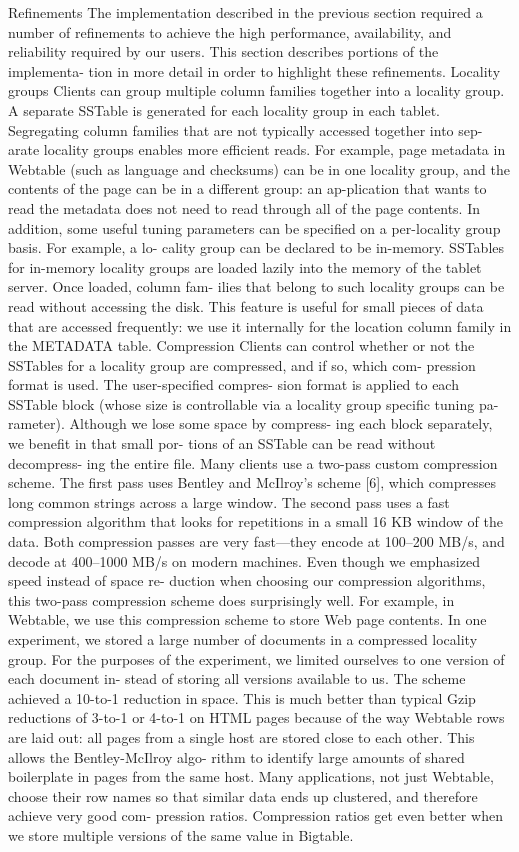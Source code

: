 \documentclass[twocolumn]{article}
\begin{document}
Refinements
The implementation described in the previous section required a number of refinements to achieve the high performance, availability, and reliability required by our users. This section describes portions of the implementa- tion in more detail in order to highlight these refinements.
Locality groups
Clients can group multiple column families together into a locality group. A separate SSTable is generated for each locality group in each tablet. Segregating column families that are not typically accessed together into sep- arate locality groups enables more efficient reads. For example, page metadata in Webtable (such as language and checksums) can be in one locality group, and the contents of the page can be in a different group: an ap-plication that wants to read the metadata does not need to read through all of the page contents.
In addition, some useful tuning parameters can be specified on a per-locality group basis. For example, a lo- cality group can be declared to be in-memory. SSTables for in-memory locality groups are loaded lazily into the memory of the tablet server. Once loaded, column fam- ilies that belong to such locality groups can be read without accessing the disk. This feature is useful for small pieces of data that are accessed frequently: we use it internally for the location column family in the METADATA table.
Compression
Clients can control whether or not the SSTables for a locality group are compressed, and if so, which com- pression format is used. The user-specified compres- sion format is applied to each SSTable block (whose size is controllable via a locality group specific tuning pa- rameter). Although we lose some space by compress- ing each block separately, we benefit in that small por- tions of an SSTable can be read without decompress- ing the entire file. Many clients use a two-pass custom compression scheme. The first pass uses Bentley and McIlroy’s scheme [6], which compresses long common strings across a large window. The second pass uses a fast compression algorithm that looks for repetitions in a small 16 KB window of the data. Both compression passes are very fast—they encode at 100–200 MB/s, and decode at 400–1000 MB/s on modern machines.
Even though we emphasized speed instead of space re- duction when choosing our compression algorithms, this two-pass compression scheme does surprisingly well. For example, in Webtable, we use this compression scheme to store Web page contents. In one experiment, we stored a large number of documents in a compressed locality group. For the purposes of the experiment, we limited ourselves to one version of each document in- stead of storing all versions available to us. The scheme achieved a 10-to-1 reduction in space. This is much better than typical Gzip reductions of 3-to-1 or 4-to-1 on HTML pages because of the way Webtable rows are laid out: all pages from a single host are stored close to each other. This allows the Bentley-McIlroy algo- rithm to identify large amounts of shared boilerplate in pages from the same host. Many applications, not just Webtable, choose their row names so that similar data ends up clustered, and therefore achieve very good com- pression ratios. Compression ratios get even better when we store multiple versions of the same value in Bigtable.
\end{document}
